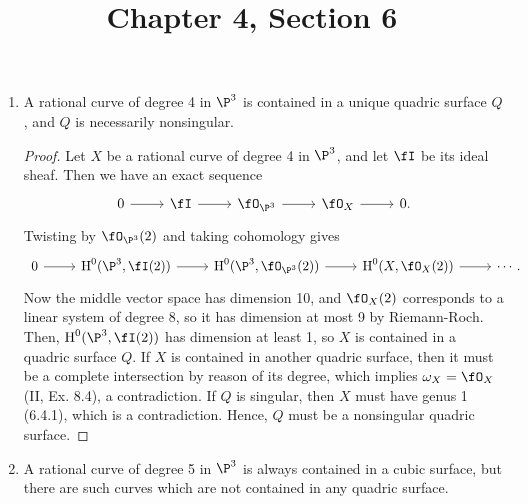 \documentclass[a4paper]{article}
\title{Chapter 4, Section 6}
\begin{document}
\maketitle

\begin{enumerate} [label=\textbf{\arabic*.}, leftmargin=0em]

    \item A rational curve of degree 4 in $\P^3$ is contained in a unique quadric surface $Q$, and $Q$ is necessarily nonsingular.

          \begin{proof}
              Let $X$ be a rational curve of degree 4 in $\P^3$, and let $\fI$ be its ideal sheaf.
              Then we have an exact sequence
              \[ \begin{tikzcd}
                      0 \arrow[r] & \fI \arrow[r] & \fO_{\P^3} \arrow[r] & \fO_X \arrow[r] & 0.
                  \end{tikzcd} \]
              Twisting by $\fO_{\P^3}(2)$ and taking cohomology gives
              \[ \begin{tikzcd}
                      0 \arrow[r] & \cH^0(\P^3, \fI(2)) \arrow[r] & \cH^0(\P^3, \fO_{\P^3}(2)) \arrow[r] & \cH^0(X, \fO_X(2)) \arrow[r] & \cdots.
                  \end{tikzcd} \]
              Now the middle vector space has dimension 10, and $\fO_X(2)$ corresponds to a linear system of degree 8, so it has dimension at most 9 by Riemann-Roch.
              Then, $\cH^0(\P^3, \fI(2))$ has dimension at least 1, so $X$ is contained in a quadric surface $Q$.
              If $X$ is contained in another quadric surface, then it must be a complete intersection by reason of its degree, which implies $\omega_X = \fO_X$ (II, Ex. 8.4), a contradiction.
              If $Q$ is singular, then $X$ must have genus 1 (6.4.1), which is a contradiction.
              Hence, $Q$ must be a nonsingular quadric surface.
          \end{proof}

    \item A rational curve of degree 5 in $\P^3$ is always contained in a cubic surface, but there are such curves which are not contained in any quadric surface.


\end{enumerate}
\end{document}
